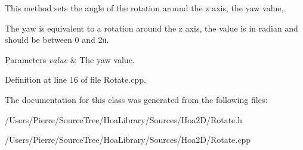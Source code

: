 This method sets the angle of the rotation around the z axis, the yaw value,. 

The yaw is equivalent to a rotation around the z axis, the value is in radian and should be between 0 and 2π.


\begin{DoxyParams}{Parameters}
{\em value} & The yaw value. \\
\hline
\end{DoxyParams}


Definition at line 16 of file Rotate.\-cpp.



The documentation for this class was generated from the following files\-:\begin{DoxyCompactItemize}
\item 
/\-Users/\-Pierre/\-Source\-Tree/\-Hoa\-Library/\-Sources/\-Hoa2\-D/Rotate.\-h\item 
/\-Users/\-Pierre/\-Source\-Tree/\-Hoa\-Library/\-Sources/\-Hoa2\-D/Rotate.\-cpp\end{DoxyCompactItemize}
